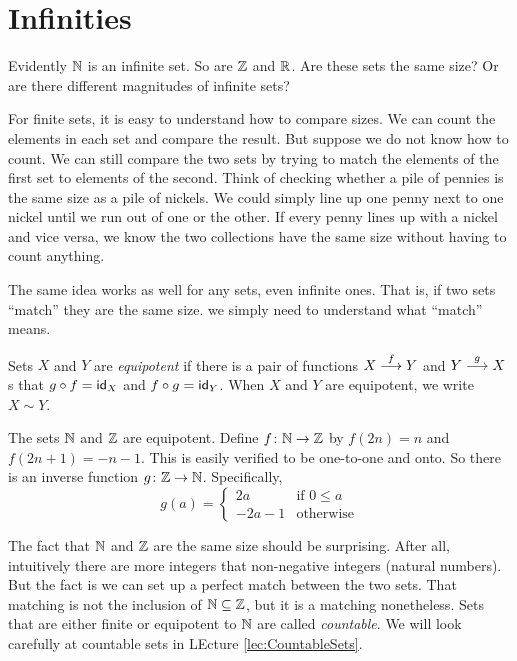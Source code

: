 \chapter{Infinities}

Evidently $\NN$ is an infinite set. So are $\ZZ$ and $\RR$. Are these sets the same size? Or are there different magnitudes of infinite sets?

For finite sets, it is easy to understand how to compare sizes. We can count the elements in each set and compare the result. But suppose we do not know how to count. We can still compare the two sets by trying to match the elements of the first set to elements of the second. Think of checking whether a pile of pennies is the same size as a pile of nickels. We could simply line up one penny next to one nickel until we run out of one or the other. If every penny lines up with a nickel and vice versa, we know the two collections have the same size without having to count anything.

The same idea works as well for any sets, even infinite ones. That is, if two sets ``match'' they are the same size. we simply need to understand what ``match'' means.

\begin{defn}
	Sets $X$ and $Y$ are \emph{equipotent} if there is a pair of functions $\sfromto fXY$ and $\sfromto gYX$ s that $g\circ f=\id_X$ and $f\circ g=\id_Y$. When $X$ and $Y$ are equipotent, we write $X\sim Y$.
\end{defn}

\begin{example}
	The sets $\NN$ and $\ZZ$ are equipotent. Define $\fromto f\NN\ZZ$ by
	$f(2n) = n$ and $f(2n+1)=-n-1$. This is easily verified to be one-to-one and onto. So there is an inverse function $\fromto g\ZZ\NN$. Specifically,
	\[g(a)=\begin{cases}
	     2a & \text{if $0\leq a$}\\
	     -2a-1& \text{otherwise}
	\end{cases}
	\]
\end{example}

The fact that $\NN$ and $\ZZ$ are the same size should be surprising. After all, intuitively there are more integers that non-negative integers (natural numbers). But the fact is we can set up a perfect match between the two sets. That matching is not the inclusion of $\NN\subseteq \ZZ$, but it is a matching nonetheless. Sets that are either finite or equipotent to $\NN$ are called \emph{countable}. We will look carefully at countable sets in LEcture \ref{lec:CountableSets}.

